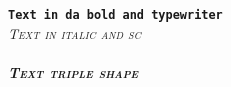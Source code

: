 \documentclass{article}
\begin{document}
\noindent\texttt{\textbf{Text in da bold and typewriter}}
\\\itshape{\scshape Text in italic and sc}
\\
\\\itshape{\textbf{\scshape Text triple\emph{ shape}}}
\end{document}
